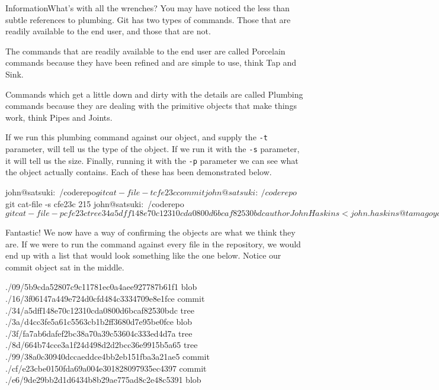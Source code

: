 \begin{callout}{Information}{What's with all the wrenches?}
You may have noticed the less than subtle references to plumbing.
Git has two types of commands.
Those that are readily available to the end user, and those that are not.

The commands that are readily available to the end user are called Porcelain commands because they have been refined and are simple to use, think Tap and Sink.

Commands which get a little down and dirty with the details are called Plumbing commands because they are dealing with the primitive objects that make things work, think Pipes and Joints.
\end{callout}

If we run this plumbing command against our object, and supply the \texttt{-t} parameter,  will tell us the type of the object.
If we run it with the \texttt{-s} parameter, it will tell us the size.
Finally, running it with the \texttt{-p} parameter we can see what the object actually contains.
Each of these has been demonstrated below.

\begin{code}
john@satsuki:~/coderepo$ git cat-file -t cfe23c
commit
john@satsuki:~/coderepo$ git cat-file -s cfe23c
215
john@satsuki:~/coderepo$ git cat-file -p cfe23c
tree 34a5dff148e70c12310cda0800d6bcaf82530bdc
author John Haskins <john.haskins@tamagoyakiinc.koala> 1301599664 +0100
committer John Haskins <john.haskins@tamagoyakiinc.koala> 1301599664 +0100

My First Ever Commit
john@satsuki:~/coderepo$
\end{code}

Fantastic! We now have a way of confirming the objects are what we think they are.
If we were to run the command against every file in the repository, we would end up with a list that would look something like the one below.
Notice our commit object sat in the middle.

\begin{code}
./09/5b9cda52807c9c11781ec0a4aee927787b61f1     blob
./16/3f06147a449e724d0cfd484c3334709e8e1fce     commit
./34/a5dff148e70c12310cda0800d6bcaf82530bdc     tree
./3a/d4cc3fe5a61c5563cb1b2ff3680d7e95be0fce     blob
./3f/fa7ab6dafef2bc38a70a39c53604c333ed4d7a     tree
./8d/664b74cce3a1f24d498d2d2bcc36e9915b5a65     tree
./99/38a0c30940dccaeddce4bb2eb151fba3a21ae5     commit
./cf/e23cbe0150fda69a004e301828097935ec4397     commit
./e6/9de29bb2d1d6434b8b29ae775ad8c2e48c5391     blob
\end{code}

